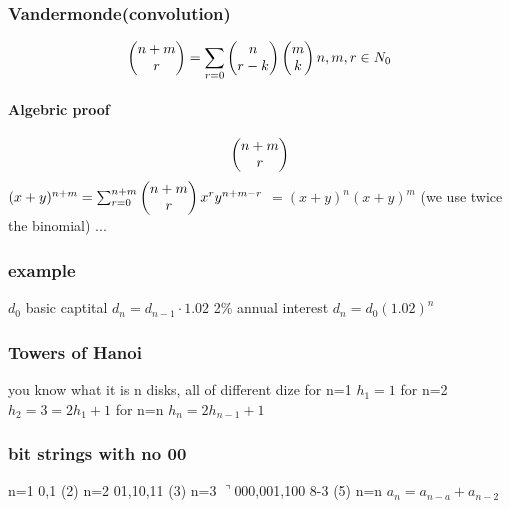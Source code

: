 \documentclass[a4paper,10pt]{article}
\begin{document}
\subsubsection{Vandermonde(convolution)}
\[
\begin{pmatrix}
 n+m\cr
 r\cr
\end{pmatrix}
=\sum_{r=0}
\begin{pmatrix}
 n\cr
 r-k\cr
\end{pmatrix}
\begin{pmatrix}
 m\cr
 k\cr
\end{pmatrix}
n,m,r\in N_0
\]
\paragraph{Algebric proof}
\[
\begin{pmatrix}
n+m\cr
r\cr
\end{pmatrix}
\]
\newline
$(x+y)^{n+m}=\sum_{r=0}^{n+m}
\begin{pmatrix}
n+m\cr
r
\end{pmatrix}
x^ry^{n+m-r}
$
\newline
$=(x+y)^n(x+y)^m$ (we use twice the binomial)
\newline
...
\newline

\subsubsection{example}
$d_0$ basic captital
\newline
$d_n=d_{n-1}\cdot 1.02$ 2\% annual interest
\newline
$d_n=d_0(1.02)^n$
\subsubsection{Towers of Hanoi}
you know what it is
\newline
n disks, all of different dize
\newline
for n=1 $h_1=1$
\newline
for n=2 $h_2=3=2h_1+1$
\newline
for n=n $h_n=2h_{n-1}+1$
\subsubsection{bit strings with no 00}
n=1 0,1 (2)
\newline
n=2 01,10,11 (3)
\newline
n=3 $\urcorner$000,001,100 8-3 (5)
\newline
n=n $a_n=a_{n-a}+a_{n-2}$
\end{document}
